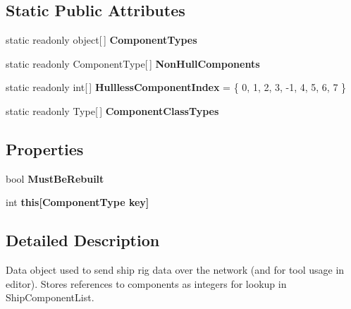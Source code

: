 \subsection*{Static Public Attributes}
\begin{DoxyCompactItemize}
\item 
static readonly object\mbox{[}$\,$\mbox{]} {\bfseries Component\-Types}
\item 
static readonly Component\-Type\mbox{[}$\,$\mbox{]} {\bfseries Non\-Hull\-Components}
\item 
\hypertarget{class_ship_data_a86aa2a6240f6c742448db2ce4cf7defe}{static readonly int\mbox{[}$\,$\mbox{]} {\bfseries Hullless\-Component\-Index} = \{ 0, 1, 2, 3, -\/1, 4, 5, 6, 7 \}}\label{class_ship_data_a86aa2a6240f6c742448db2ce4cf7defe}

\item 
static readonly Type\mbox{[}$\,$\mbox{]} {\bfseries Component\-Class\-Types}
\end{DoxyCompactItemize}
\subsection*{Properties}
\begin{DoxyCompactItemize}
\item 
\hypertarget{class_ship_data_aac11d1d3a4544a1179546eb8c8bb9988}{bool {\bfseries Must\-Be\-Rebuilt}}\label{class_ship_data_aac11d1d3a4544a1179546eb8c8bb9988}

\item 
\hypertarget{class_ship_data_aca9ad1e98ef2ae074cd214d869a64de7}{int {\bfseries this\mbox{[}\-Component\-Type key\mbox{]}}}\label{class_ship_data_aca9ad1e98ef2ae074cd214d869a64de7}

\end{DoxyCompactItemize}


\subsection{Detailed Description}
Data object used to send ship rig data over the network (and for tool usage in editor). Stores references to components as integers for lookup in Ship\-Component\-List. 



